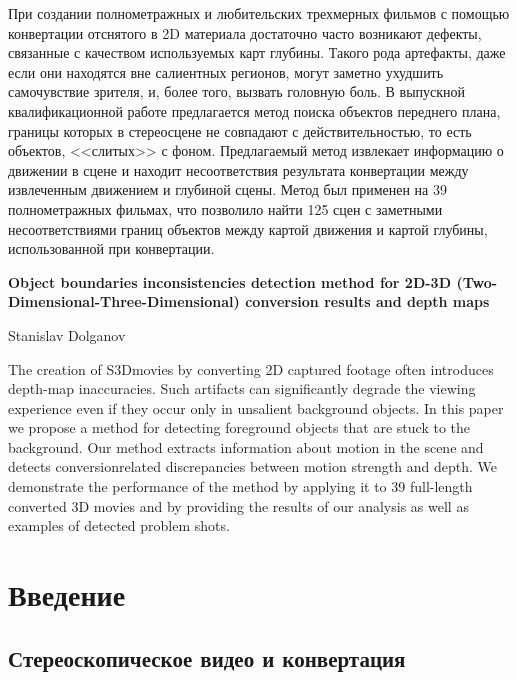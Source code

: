 \documentclass[14pt, a4paper]{extarticle}
\begin{document}
При создании полнометражных и любительских трехмерных фильмов с помощью 
конвертации отснятого в 2D материала достаточно часто возникают дефекты, 
связанные с качеством используемых карт глубины. Такого рода артефакты, 
даже если они находятся вне салиентных регионов,  могут заметно ухудшить 
самочувствие зрителя, и, более того, вызвать головную боль. В выпускной
квалификационной работе предлагается метод поиска объектов переднего плана, границы которых 
в стереосцене не совпадают с действительностью, то есть объектов, <<слитых>> 
с фоном. Предлагаемый метод извлекает информацию о движении в сцене и 
находит несоответствия результата конвертации между извлеченным движением и глубиной сцены.
Метод был применен на 39 полнометражных фильмах, что позволило найти 125 сцен 
с заметными несоответствиями границ объектов между картой движения и картой глубины, 
использованной при конвертации.

\vspace{2cm}

\textbf{Object boundaries inconsistencies detection method 
for 2D-3D (Two-Dimensional-Three-Dimensional)
conversion results and depth maps}

\vspace{0.5cm}
Stanislav Dolganov
\vspace{0.5cm}

The creation of S3Dmovies by converting 2D captured footage
often introduces depth-map inaccuracies. Such artifacts can
significantly degrade the viewing experience even if they occur
only in unsalient background objects.
In this paper we propose a method for detecting foreground
objects that are stuck to the background. Our method extracts
information about motion in the scene and detects conversionrelated
discrepancies between motion strength and depth. We
demonstrate the performance of the method by applying it
to 39 full-length converted 3D movies and by providing the
results of our analysis as well as examples of detected problem
shots.

\newpage
{}
\tableofcontents

\newpage
\section{Введение}

\subsection{Стереоскопическое видео и конвертация}
\end{document}
